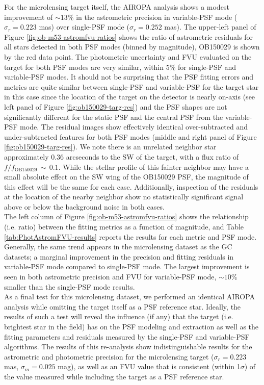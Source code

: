 \documentclass[]{spie}  %
\begin{document}
\indent For the microlensing target itself, the AIROPA analysis shows a modest improvement of ${\sim}13\%$ in the astrometric precision in variable-PSF mode ($\sigma_{r}=0.223$ mas) over single-PSF mode ($\sigma_{r}=0.252$ mas). The upper-left panel of Figure \ref{fig:ob-m53-astromfvu-ratios} shows the ratio of astrometric residuals for all stars detected in both PSF modes (binned by magnitude), OB150029 is shown by the red data point. The photometric uncertainty and FVU evaluated on the target for both PSF modes are very similar, within 5\% for single-PSF and variable-PSF modes. It should not be surprising that the PSF fitting errors and metrics are quite similar between single-PSF and variable-PSF for the target star in this case since the location of the target on the detector is nearly on-axis (see left panel of Figure \ref{fig:ob150029-targ-res}) and the PSF shapes are not significantly different for the static PSF and the central PSF from the variable-PSF mode. The residual images show effectively identical over-subtracted and under-subtracted features for both PSF modes (middle and right panel of Figure \ref{fig:ob150029-targ-res}). We note there is an unrelated neighbor star approximately 0.36 arcseconds to the SW of the target, with a flux ratio of $f/f_{\textrm{OB150029}}\, {\sim}\, 0.1$. While the stellar profile of this fainter neighbor may have a small absolute effect on the SW wing of the OB150029 PSF, the magnitude of this effect will be the same for each case. Additionally, inspection of the residuals at the location of the nearby neighbor show no statistically significant signal above or below the background noise in both cases.
\\
\indent The left column of Figure \ref{fig:ob-m53-astromfvu-ratios} shows the relationship (i.e. ratio) between the fitting metrics as a function of magnitude, and Table \ref{tab:PhotAstromFVU-results} reports the results for each metric and PSF mode. Generally, the same trend appears in the microlensing dataset as the GC datasets; a marginal improvement in the precision and fitting residuals in variable-PSF mode compared to single-PSF mode. The largest improvement is seen in both astrometric precision and FVU for variable-PSF mode, ${\sim} 10\%$ smaller than the single-PSF mode results.
\\
\indent As a final test for this microlensing dataset, we performed an identical AIROPA analysis while omitting the target itself as a PSF reference star. Ideally, the results of such a test will reveal the influence (if any) that the target (i.e. brightest star in the field) has on the PSF modeling and extraction as well as the fitting parameters and residuals measured by the single-PSF and variable-PSF algorithms. The results of this re-analysis show indistinguishable results for the astrometric and photometric precision for the microlensing target ($\sigma_{r}=0.223$ mas, $\sigma_{m}=0.025$ mag), as well as an FVU value that is consistent (within 1$\sigma$) of the value measured while including the target as a PSF reference star.
\end{document}
